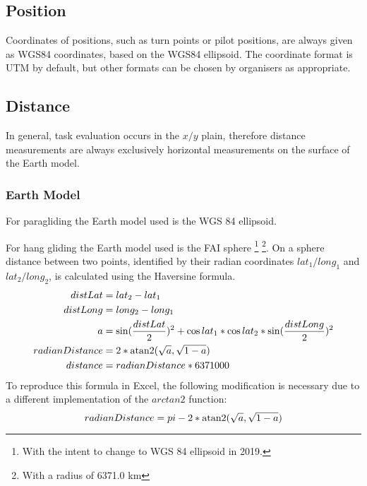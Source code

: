 \documentclass[gap.tex]{subfiles}
\begin{document}
\label{sec:use-of-tracklog-data}
\subsection{Position}
Coordinates of positions, such as turn points or pilot positions, are always
given as WGS84 coordinates, based on the WGS84 ellipsoid. The coordinate format
is UTM by default, but other formats can be chosen by organisers as
appropriate.

\subsection{Distance}
\label{sec:distance}
In general, task evaluation occurs in the \(x/y\) plain, therefore distance
measurements are always exclusively horizontal measurements on the surface of
the Earth model.

\subsubsection{Earth Model}
\begin{pg}
    For paragliding the Earth model used is the WGS 84 ellipsoid.
\end{pg}

\begin{hg}
    For hang gliding the Earth model used is the FAI sphere \footnote{With the
    intent to change to WGS 84 ellipsoid in 2019.} \footnote{With a radius of
    6371.0 km}.  On a sphere distance between two points, identified by their
    radian coordinates \(lat_1/long_1\) and \(lat_2/long_2\), is calculated
    using the Haversine formula.
    \begin{align*}
        distLat &= lat_2 - lat_1 \\
        distLong &= long_2 - long_1 \\
        a &= \sin(\frac{distLat}{2})^2 + \cos lat_1 * \cos lat_2 * \sin(\frac{distLong}{2})^2 \\
        radianDistance &= 2 * \operatorname{atan2}(\sqrt a, \sqrt{1 - a}) \\
        distance &= radianDistance * 6371000 \\
    \end{align*}
    To reproduce this formula in Excel, the following modification is necessary due
    to a different implementation of the \(arctan2\) function:
    \[ radianDistance = pi - 2 * \operatorname{atan2}(\sqrt a, \sqrt{1 - a}) \]
\end{hg}
\end{document}

